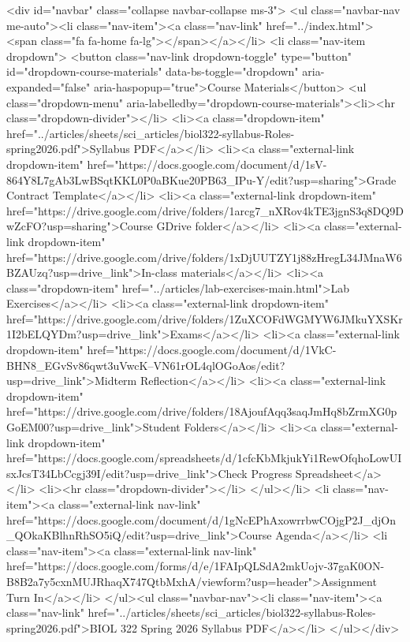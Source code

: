     <div id="navbar" class="collapse navbar-collapse ms-3">
      <ul class="navbar-nav me-auto"><li class="nav-item"><a class="nav-link" href="../index.html"><span class="fa fa-home fa-lg"></span></a></li>
<li class="nav-item dropdown">
  <button class="nav-link dropdown-toggle" type="button" id="dropdown-course-materials" data-bs-toggle="dropdown" aria-expanded="false" aria-haspopup="true">Course Materials</button>
  <ul class="dropdown-menu" aria-labelledby="dropdown-course-materials"><li><hr class="dropdown-divider"></li>
    <li><a class="dropdown-item" href="../articles/sheets/sci_articles/biol322-syllabus-Roles-spring2026.pdf">Syllabus PDF</a></li>
    <li><a class="external-link dropdown-item" href="https://docs.google.com/document/d/1sV-864Y8L7gAb3LwBSqtKKL0P0aBKue20PB63_IPu-Y/edit?usp=sharing">Grade Contract Template</a></li>
    <li><a class="external-link dropdown-item" href="https://drive.google.com/drive/folders/1arcg7_nXRov4kTE3jgnS3q8DQ9DwZcFO?usp=sharing">Course GDrive folder</a></li>
    <li><a class="external-link dropdown-item" href="https://drive.google.com/drive/folders/1xDjUUTZY1j88zHregL34JMnaW6BZAUzq?usp=drive_link">In-class materials</a></li>
    <li><a class="dropdown-item" href="../articles/lab-exercises-main.html">Lab Exercises</a></li>
    <li><a class="external-link dropdown-item" href="https://drive.google.com/drive/folders/1ZuXCOFdWGMYW6JMkuYXSKr1I2bELQYDm?usp=drive_link">Exams</a></li>
    <li><a class="external-link dropdown-item" href="https://docs.google.com/document/d/1VkC-BHN8_EGvSv86qwt3uVwcK--VN61rOL4qlOGoAos/edit?usp=drive_link">Midterm Reflection</a></li>
    <li><a class="external-link dropdown-item" href="https://drive.google.com/drive/folders/18AjoufAqq3saqJmHq8bZrmXG0pGoEM00?usp=drive_link">Student Folders</a></li>
    <li><a class="external-link dropdown-item" href="https://docs.google.com/spreadsheets/d/1cfcKbMkjukYi1RewOfqhoLowUIsxJcsT34LbCcgj39I/edit?usp=drive_link">Check Progress Spreadsheet</a></li>
    <li><hr class="dropdown-divider"></li>
  </ul></li>
<li class="nav-item"><a class="external-link nav-link" href="https://docs.google.com/document/d/1gNcEPhAxowrrbwCOjgP2J_djOn_QOkaKBlhnRhSO5iQ/edit?usp=drive_link">Course Agenda</a></li>
<li class="nav-item"><a class="external-link nav-link" href="https://docs.google.com/forms/d/e/1FAIpQLSdA2mkUojv-37gaK0ON-B8B2a7y5cxnMUJRhaqX747QtbMxhA/viewform?usp=header">Assignment Turn In</a></li>
      </ul><ul class="navbar-nav"><li class="nav-item"><a class="nav-link" href="../articles/sheets/sci_articles/biol322-syllabus-Roles-spring2026.pdf">BIOL 322 Spring 2026 Syllabus PDF</a></li>
      </ul></div>


